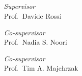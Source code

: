 \documentclass[../thesis.tex]{subfiles}
\begin{document}
    \begin{titlepage}
        \begin{center}
            \begin{Large}
                \textbf{\myUni}\\
            \end{Large}

            \vspace{10pt}

            \begin{large}
                \textsc{\myDepartment}\\
                \textsc{\myFaculty}\\
            \end{large}

            \vspace{10pt}

            \begin{LARGE}
                \begin{center}
                    \textbf{\myTitle}\\
                \end{center}
            \end{LARGE}

            \vspace{100pt}

            \begin{large}
                \begin{flushleft}
                    \textit{Supervisor}\\
                    \vspace{1pt}
                    Prof.\ Davide Rossi
                \end{flushleft}
                \begin{flushleft}
                    \textit{Co-supervisor}\\
                    \vspace{1pt}
                    Prof.\ Nadia S. Noori
                \end{flushleft}
                \begin{flushleft}
                    \textit{Co-supervisor}\\
                    \vspace{1pt}
                    Prof.\ Tim A. Majchrzak
                \end{flushleft}
            
                \vspace{0pt} 


\end{large}
\end{center}
\end{titlepage}
\end{document}
